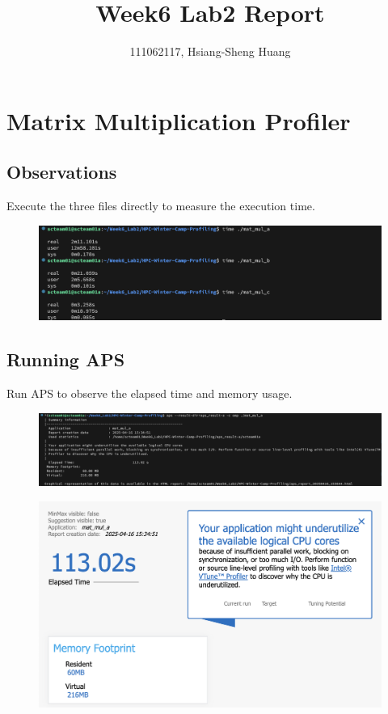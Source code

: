 \documentclass{article}
\title{Week6 Lab2 Report}
\author{111062117, Hsiang-Sheng Huang}
\begin{document}
\maketitle

\section*{Matrix Multiplication Profiler}

\subsection*{Observations}

Execute the three files directly to measure the execution time.

\begin{figure}[htbp]
    \centering
    \includegraphics[width=1\textwidth]{./img/q1-1.png}
\end{figure}

\subsection*{Running APS}

Run APS to observe the elapsed time and memory usage.

\begin{figure}[htbp]
    \centering
    \includegraphics[width=1\textwidth]{./img/q1-2.png}
\end{figure}

\begin{figure}[htbp]
    \centering
    \includegraphics[width=1\textwidth]{./img/q1-3.png}
\end{figure}
\end{document}
